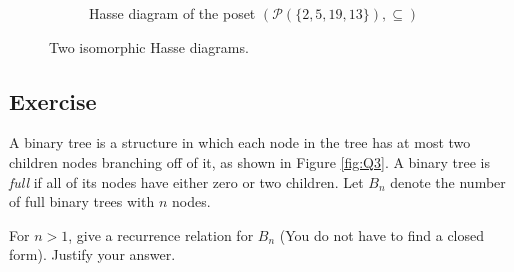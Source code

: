 \documentclass{article}
\newcounter{counter}
\newcommand{\Exercise}{Exercise \stepcounter{counter}\thecounter}
\begin{document}
\begin{figure}[htbp]
\begin{subfigure}{0.49\textwidth}
{
            }
            \caption{Hasse diagram of the poset $(\mathcal{P}(\{2, 5, 19, 13\}), \subseteq)$}
            \label{fig:Q2b}
        \end{subfigure}
        \caption{Two isomorphic Hasse diagrams.}
        \label{fig:Q2}
    \end{figure}

\subsection*{\Exercise}
    A binary tree is a structure in which each node in the tree has at most two children nodes branching off of it, as shown in Figure \ref{fig:Q3}. A binary tree is \textit{full} if all of its nodes have either zero or two children. Let $B_{n}$ denote the number of full binary trees with $n$ nodes.
    
    \vspace{1.5mm}
    For $n > 1$, give a recurrence relation for $B_{n}$ (You do not have to find a closed form). Justify your answer.
\end{document}
